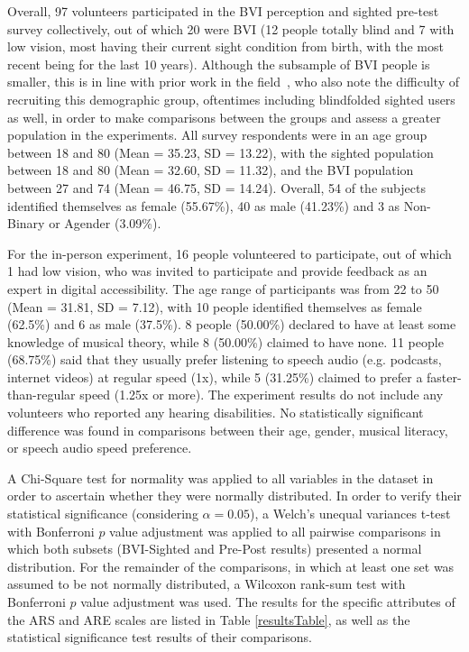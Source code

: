\documentclass{vgtc}                          %
\begin{document}
Overall, 97 volunteers participated in the BVI perception and sighted pre-test survey collectively, out of which 20 were BVI (12 people totally blind and 7 with low vision, most having their current sight condition from birth, with the most recent being for the last 10 years). Although the subsample of BVI people is smaller, this is in line with prior work in the field~\cite{Lock:2020, Liu:2018, pare:2021, Coughlan:2020, Thevin:2020}, who also note the difficulty of recruiting this demographic group, oftentimes including blindfolded sighted users as well, in order to make comparisons between the groups and assess a greater population in the experiments. All survey respondents were in an age group between 18 and 80 (Mean = 35.23, SD = 13.22), with the sighted population between 18 and 80 (Mean = 32.60, SD = 11.32), and the BVI population between 27 and 74 (Mean = 46.75, SD = 14.24). Overall, 54 of the subjects identified themselves as female (55.67\%), 40 as male (41.23\%) and 3 as Non-Binary or Agender (3.09\%).

For the in-person experiment, 16 people volunteered to participate, out of which 1 had low vision, who was invited to participate and provide feedback as an expert in digital accessibility. The age range of participants was from 22 to 50 (Mean = 31.81, SD = 7.12), with 10 people identified themselves as female (62.5\%) and 6 as male (37.5\%). 8 people (50.00\%) declared to have at least some knowledge of musical theory, while 8 (50.00\%) claimed to have none. 11 people (68.75\%) said that they usually prefer listening to speech audio (e.g. podcasts, internet videos) at regular speed (1x), while 5 (31.25\%) claimed to prefer a faster-than-regular speed (1.25x or more). The experiment results do not include any volunteers who reported any hearing disabilities. No statistically significant difference was found in comparisons between their age, gender, musical literacy, or speech audio speed preference.


A Chi-Square test for normality was applied to all variables in the dataset in order to ascertain whether they were normally distributed. In order to verify their statistical significance (considering $\alpha = 0.05$), a Welch's unequal variances t-test with Bonferroni $p$ value adjustment was applied to all pairwise comparisons in which both subsets (BVI-Sighted and Pre-Post results) presented a normal distribution. For the remainder of the comparisons, in which at least one set was assumed to be not normally distributed, a Wilcoxon rank-sum test with Bonferroni $p$ value adjustment was used. The results for the specific attributes of the ARS and ARE scales are listed in Table \ref{resultsTable}, as well as the statistical significance test results of their comparisons. 
\end{document}
